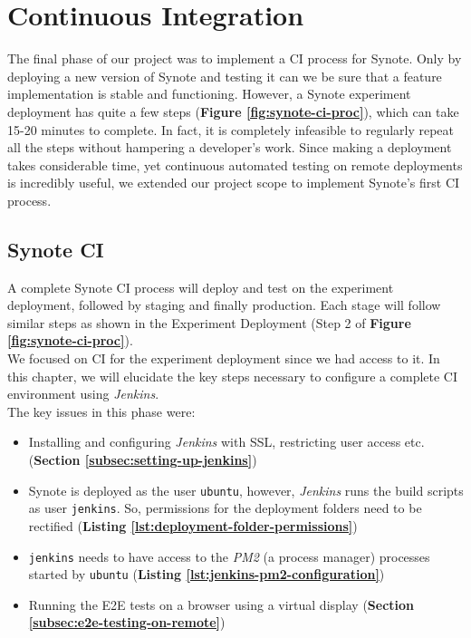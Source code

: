 \chapter{Continuous Integration}
\label{chap:continuous-integration}

The final phase of our project was to implement a CI process for Synote. Only by deploying a new version of Synote and testing it can we be sure that a feature implementation is stable and functioning. However, a Synote experiment deployment has quite a few steps (\textbf{Figure \ref{fig:synote-ci-proc}}), which can take 15-20 minutes to complete. In fact, it is completely infeasible to regularly repeat all the steps without hampering a developer's work. Since making a deployment takes  considerable time, yet continuous automated testing on remote deployments is incredibly useful, we extended our project scope to implement Synote's first CI process.

\section{Synote CI}
\label{sec:synote-ci}

A complete Synote CI process will deploy and test on the experiment deployment, followed by staging and finally production. Each stage will follow similar steps as shown in the Experiment Deployment (Step 2 of \textbf{Figure \ref{fig:synote-ci-proc}}).\\

We focused on CI for the experiment deployment since we had access to it. In this chapter, we will elucidate the key steps necessary to configure a complete CI environment using \textit{Jenkins}.\\

The key issues in this phase were:

\begin{itemize}

  \item Installing and configuring \textit{Jenkins} with SSL, restricting user access etc. (\textbf{Section \ref{subsec:setting-up-jenkins}})

  \item Synote is deployed as the user \texttt{ubuntu}, however, \textit{Jenkins} runs the build scripts as user \texttt{jenkins}. So, permissions for the deployment folders need to be rectified (\textbf{Listing \ref{lst:deployment-folder-permissions}})

  \item \texttt{jenkins} needs to have access to the \textit{PM2} (a process manager) processes started by \texttt{ubuntu} (\textbf{Listing \ref{lst:jenkins-pm2-configuration}})

  \item Running the E2E tests on a browser using a virtual display (\textbf{Section \ref{subsec:e2e-testing-on-remote}})

\end{itemize}


